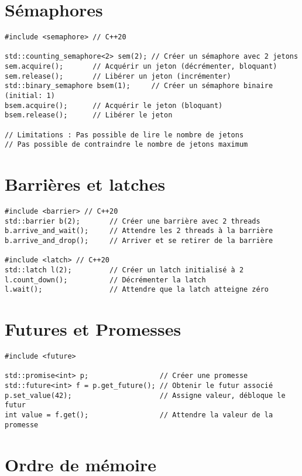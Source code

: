 \documentclass{article}
\begin{document}
\begin{multicols*}{3}
\section*{Sémaphores}

\begin{lstlisting}
#include <semaphore> // C++20

std::counting_semaphore<2> sem(2); // Créer un sémaphore avec 2 jetons
sem.acquire();       // Acquérir un jeton (décrémenter, bloquant)
sem.release();       // Libérer un jeton (incrémenter)
std::binary_semaphore bsem(1);     // Créer un sémaphore binaire (initial: 1)
bsem.acquire();      // Acquérir le jeton (bloquant)
bsem.release();      // Libérer le jeton

// Limitations : Pas possible de lire le nombre de jetons
// Pas possible de contraindre le nombre de jetons maximum
\end{lstlisting}

\section*{Barrières et latches}
\begin{lstlisting}
#include <barrier> // C++20
std::barrier b(2);       // Créer une barrière avec 2 threads
b.arrive_and_wait();     // Attendre les 2 threads à la barrière
b.arrive_and_drop();     // Arriver et se retirer de la barrière

#include <latch> // C++20
std::latch l(2);         // Créer un latch initialisé à 2
l.count_down();          // Décrémenter la latch
l.wait();                // Attendre que la latch atteigne zéro
\end{lstlisting}

\section*{Futures et Promesses}

\begin{lstlisting}
#include <future>

std::promise<int> p;                 // Créer une promesse
std::future<int> f = p.get_future(); // Obtenir le futur associé
p.set_value(42);                     // Assigne valeur, débloque le futur
int value = f.get();                 // Attendre la valeur de la promesse
\end{lstlisting}

\section*{Ordre de mémoire}


\end{multicols*}
\end{document}
